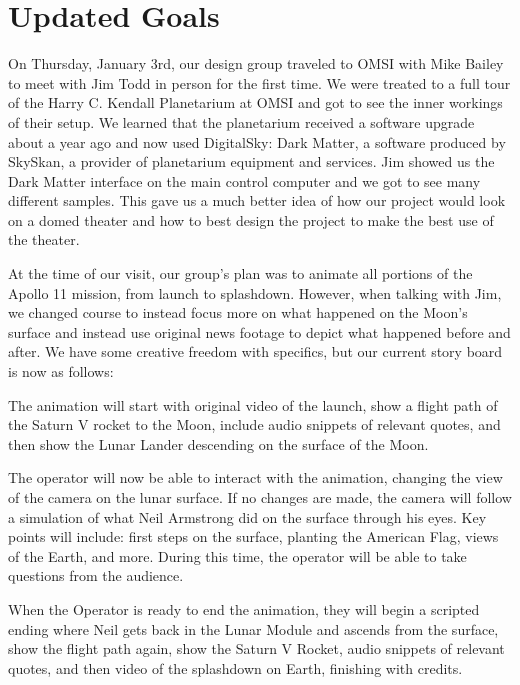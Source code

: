 \documentclass[onecolumn, draftclsnofoot,10pt, compsoc]{IEEEtran}
\begin{document}
\clearpage


\section{Updated Goals}
On Thursday, January 3rd, our design group traveled to OMSI with Mike Bailey to meet with Jim Todd in person for the first time. We were treated to a full tour of the Harry C. Kendall Planetarium at OMSI and got to see the inner workings of their setup. We learned that the planetarium received a software upgrade about a year ago and now used DigitalSky: Dark Matter, a software produced by SkySkan, a provider of planetarium equipment and services. Jim showed us the Dark Matter interface on the main control computer and we got to see many different samples. This gave us a much better idea of how our project would look on a domed theater and how to best design the project to make the best use of the theater. 

At the time of our visit, our group's plan was to animate all portions of the Apollo 11 mission, from launch to splashdown. However, when talking with Jim, we changed course to instead focus more on what happened on the Moon's surface and instead use original news footage to depict what happened before and after. We have some creative freedom with specifics, but our current story board is now as follows: 

\begin{list}
    \item The animation will start with original video of the launch, show a flight path of the Saturn V rocket to the Moon, include audio snippets of relevant quotes, and then show the Lunar Lander descending on the surface of the Moon.
    \item The operator will now be able to interact with the animation, changing the view of the camera on the lunar surface. If no changes are made, the camera will follow a simulation of what Neil Armstrong did on the surface through his eyes. Key points will include: first steps on the surface, planting the American Flag, views of the Earth, and more. During this time, the operator will be able to take questions from the audience. 
    \item When the Operator is ready to end the animation, they will begin a scripted ending where Neil gets back in the Lunar Module and ascends from the surface, show the flight path again, show the Saturn V Rocket, audio snippets of relevant quotes, and then video of the splashdown on Earth, finishing with credits. 
\end{list}
\end{document}

